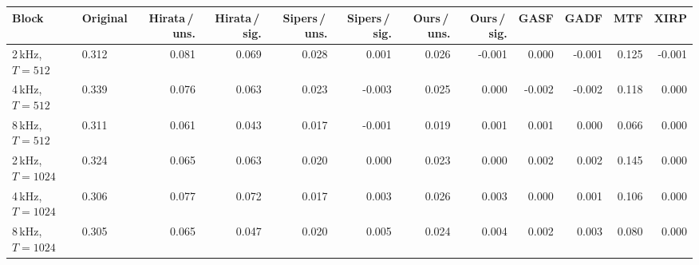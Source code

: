 \begin{tabular}{@{}llrrrrrrrrrr@{}}
\toprule
Block & Original & Hirata\,/\,uns. & Hirata\,/\,sig. & Sipers\,/\,uns. & Sipers\,/\,sig. & Ours\,/\,uns. & Ours\,/\,sig. & GASF & GADF & MTF & XIRP \\
\midrule
2\,kHz, $T=512$ & 0.312 & 0.081 & 0.069 & 0.028 & 0.001 & 0.026 & -0.001 & 0.000 & -0.001 & 0.125 & -0.001 \\
4\,kHz, $T=512$ & 0.339 & 0.076 & 0.063 & 0.023 & -0.003 & 0.025 & 0.000 & -0.002 & -0.002 & 0.118 & 0.000 \\
8\,kHz, $T=512$ & 0.311 & 0.061 & 0.043 & 0.017 & -0.001 & 0.019 & 0.001 & 0.001 & 0.000 & 0.066 & 0.000 \\
2\,kHz, $T=1024$ & 0.324 & 0.065 & 0.063 & 0.020 & 0.000 & 0.023 & 0.000 & 0.002 & 0.002 & 0.145 & 0.000 \\
4\,kHz, $T=1024$ & 0.306 & 0.077 & 0.072 & 0.017 & 0.003 & 0.026 & 0.003 & 0.000 & 0.001 & 0.106 & 0.000 \\
8\,kHz, $T=1024$ & 0.305 & 0.065 & 0.047 & 0.020 & 0.005 & 0.024 & 0.004 & 0.002 & 0.003 & 0.080 & 0.000 \\
\bottomrule
\end{tabular}
